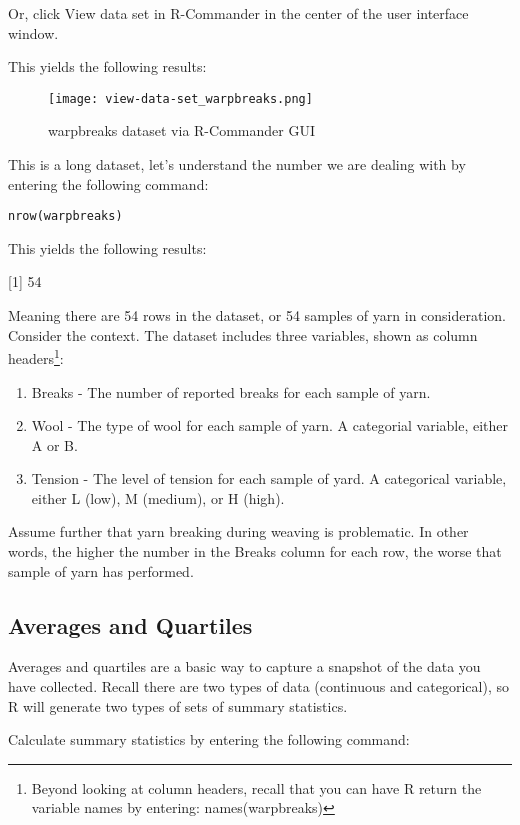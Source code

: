 Or, click View data set in R-Commander in the center of the user interface 
window.

This yields the following results:

\begin{figure}[htbp]
\texttt{[image: view-data-set\_warpbreaks.png]}
 \caption{warpbreaks dataset via R-Commander GUI}
 \label{fig:view-data-set_warpbreaks}
\end{figure}

This is a long dataset, let's understand the number we are dealing with by 
entering the following command:

\texttt{nrow(warpbreaks)}

This yields the following results:

[1] 54

Meaning there are 54 rows in the dataset, or 54 samples of yarn in 
consideration. Consider the context. The dataset includes three variables, 
shown as column headers\footnote{Beyond looking at column headers, recall that 
you can have R return the variable names by entering: names(warpbreaks)}:

\begin{enumerate}
 \item Breaks - The number of reported breaks for each sample of yarn.
 \item Wool - The type of wool for each sample of yarn. A categorial variable, 
 either A or B.
 \item Tension - The level of tension for each sample of yard. A categorical 
 variable, either L (low), M (medium), or H (high).
\end{enumerate}

Assume further that yarn breaking during weaving is problematic. In other 
words, the higher the number in the Breaks column for each row, the worse that 
sample of yarn has performed. 

\subsection{Averages and Quartiles}
Averages and quartiles are a basic way to capture a snapshot of the data you 
have collected. Recall there are two types of data (continuous and 
categorical), so R will generate two types of sets of summary statistics.

Calculate summary statistics by entering the following command:


